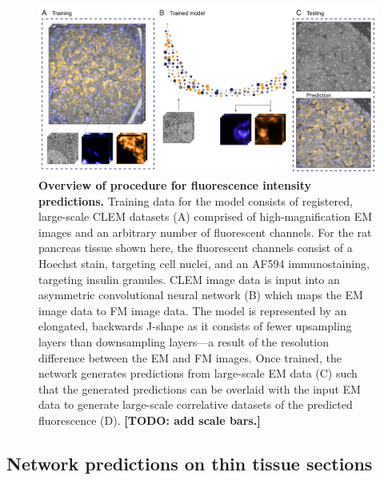 

\begin{figure}[!tbh]
    \centering
    \includegraphics[width=\linewidth]{chapter-4/figures/fig1_overview_v5.pdf}
    \caption{\textbf{Overview of procedure for fluorescence intensity predictions.}
    Training data for the model consists of registered, large-scale CLEM datasets (A) comprised of high-magnification EM images and an arbitrary number of fluorescent channels. For the rat pancreas tissue shown here, the fluorescent channels consist of a Hoechst stain, targeting cell nuclei, and an AF594 immunostaining, targeting insulin granules. CLEM image data is input into an asymmetric convolutional neural network (B) which maps the EM image data to FM image data. The model is represented by an elongated, backwards J-shape as it consists of fewer upsampling layers than downsampling layers---a result of the resolution difference between the EM and FM images. Once trained, the network generates predictions from large-scale EM data (C) such that the generated predictions can be overlaid with the input EM data to generate large-scale correlative datasets of the predicted fluorescence (D).
    \textbf{[TODO: add scale bars.]}}
    \label{fig:4.1_overview}
\end{figure}



\clearpage
\subsection{Network predictions on thin tissue sections}
\label{sec:4results_pancreas}

